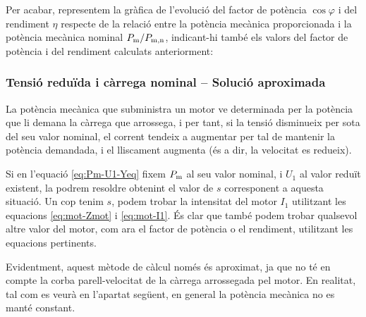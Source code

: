 \begin{exemple}
	Per acabar, representem  la gràfica de l'evolució del factor de potència $\cos\varphi$ i del rendiment $\eta$  respecte de la relació entre la potència mecànica proporcionada i la potència mecànica nominal $P_\mathrm{m}/P_\mathrm{m,n}$, indicant-hi també els valors del factor de potència i del rendiment calculats anteriorment:
	\begin{center}
		
	\end{center}

\end{exemple}
	
\subsubsection{Tensió reduïda i càrrega nominal -- Solució aproximada}

La potència mecànica que subministra un motor ve determinada per la potència que li demana la càrrega que arrossega, i per tant, si la tensió disminueix per sota del seu valor nominal, el corrent tendeix a augmentar per tal de mantenir la potència demandada, i el lliscament augmenta (és a dir, la velocitat es redueix).

Si en l'equació \eqref{eq:Pm-U1-Yeq} fixem $P_\mathrm{m}$ al seu valor nominal, i $U_1$ al valor reduït existent, la podrem resoldre obtenint el valor de $s$ corresponent  a aquesta situació. Un cop tenim $s$, podem trobar la intensitat del motor $I_1$ utilitzant les equacions \eqref{eq:mot-Zmot} i \eqref{eq:mot-I1}. És clar que també podem trobar qualsevol altre valor del motor, com  ara el factor de potència o el rendiment, utilitzant les equacions pertinents.

Evidentment, aquest mètode de càlcul només és aproximat, ja que no té en compte la corba parell-velocitat de la càrrega arrossegada pel motor. En realitat, tal com es veurà en l'apartat següent, en general la potència mecànica no es manté constant.

